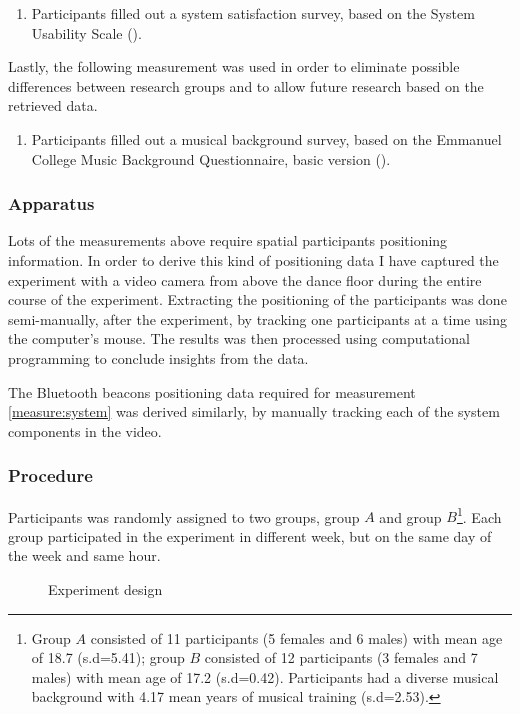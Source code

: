 \documentclass[a4paper,11pt]{article}
\begin{document}
{\begin{enumerate}[resume]
	\item \label{measure:survey:usability} Participants filled out a system satisfaction survey, based on the System Usability Scale (\cite{brooke96}).
\end{enumerate}
Lastly, the following measurement was used in order to eliminate possible differences between research groups and to allow future research based on the retrieved data.
\begin{enumerate}[resume]
	\item \label{measure:survey:musical} Participants filled out a musical background survey, based on the Emmanuel College Music Background Questionnaire, basic version (\cite{web:zhao12}).
\end{enumerate}

\subsubsection{Apparatus}\label{aparatus}

Lots of the measurements above require spatial participants positioning information.
In order to derive this kind of positioning data I have captured the experiment with a video camera from above the dance floor during the entire course of the experiment.
Extracting the positioning of the participants was done semi-manually, after the experiment, by tracking one participants at a time using the computer's mouse.
The results was then processed using computational programming to conclude insights from the data.

The Bluetooth beacons positioning data required for measurement \ref{measure:system} was derived similarly, by manually tracking each of the system components in the video.

\subsubsection{Procedure}

Participants was randomly assigned to two groups, group $A$ and group $B$\@\footnote{Group $A$ consisted of 11 participants (5 females and 6 males) with mean age of 18.7 (s.d=5.41); group $B$ consisted of 12 participants (3 females and 7 males) with mean age of 17.2 (s.d=0.42). Participants had a diverse musical background with 4.17 mean years of musical training (s.d=2.53).}.
Each group participated in the experiment in different week, but on the same day of the week and same hour.

\begin{figure}[!htb]
	\centering
	\def\svgwidth{0.9\textwidth}
  	
	\caption{Experiment design}\label{fig:experiment}
\end{figure}

}
\end{document}
